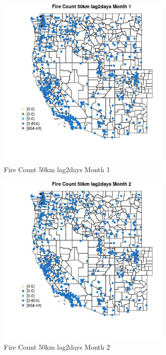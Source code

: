 \begin{figure} 
\centering  
\includegraphics[width=0.77\textwidth]{Code_Outputs/Report_ML_input_PM25_Step4_part_f_de_duplicated_aves_prioritize_24hr_obswNAs_MapObsMo1Fire_Count_50km_lag2days.jpg} 
\caption{\label{fig:Report_ML_input_PM25_Step4_part_f_de_duplicated_aves_prioritize_24hr_obswNAsMapObsMo1Fire_Count_50km_lag2days}Fire Count 50km lag2days Month 1} 
\end{figure} 
 

\begin{figure} 
\centering  
\includegraphics[width=0.77\textwidth]{Code_Outputs/Report_ML_input_PM25_Step4_part_f_de_duplicated_aves_prioritize_24hr_obswNAs_MapObsMo2Fire_Count_50km_lag2days.jpg} 
\caption{\label{fig:Report_ML_input_PM25_Step4_part_f_de_duplicated_aves_prioritize_24hr_obswNAsMapObsMo2Fire_Count_50km_lag2days}Fire Count 50km lag2days Month 2} 
\end{figure} 
 

